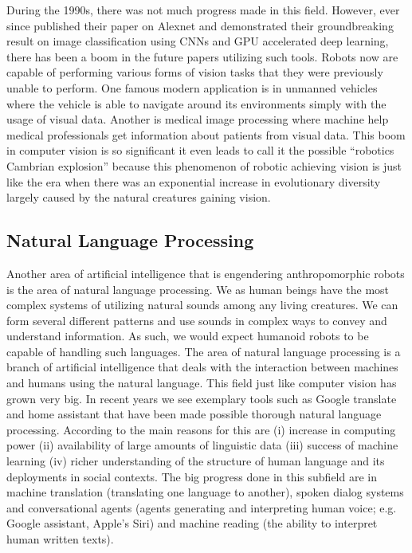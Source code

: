 \documentclass[conference]{IEEEtran}
\begin{document}
During the 1990s, there was not much progress made in this field. However, ever since \textcite{krizhevsky2012imagenet} published their paper on Alexnet and demonstrated their groundbreaking result on image classification using CNNs and GPU accelerated deep learning, there has been a boom in the future papers utilizing such tools. Robots now are capable of performing various forms of vision tasks that they were previously unable to perform. One famous modern application is in unmanned vehicles where the vehicle is able to navigate around its environments simply with the usage of visual data. Another is medical image processing where machine help medical professionals get information about patients from visual data. This boom in computer vision is so significant it even leads \textcite{pratt2015cambrian} to call it the possible ``robotics Cambrian explosion'' because this phenomenon of robotic achieving vision is just like the era when there was an exponential increase in evolutionary diversity largely caused by the natural creatures gaining vision. 


\subsection{Natural Language Processing}
Another area of artificial intelligence that is engendering anthropomorphic robots is the area of natural language processing. We as human beings have the most complex systems of utilizing natural sounds among any living creatures. We can form several different patterns and use sounds in complex ways to convey and understand information. As such, we would expect humanoid robots to be capable of handling such languages. The area of natural language processing is a branch of artificial intelligence that deals with the interaction between machines and humans using the natural language. This field just like computer vision has grown very big. In recent years we see exemplary tools such as Google translate and home assistant that have been made possible thorough natural language processing. According to \textcite{hirschberg2015advances} the main reasons for this are (i) increase in computing power (ii) availability of large amounts of linguistic data (iii) success of machine learning (iv) richer understanding of the structure of human language and its deployments in social contexts. The big progress done in this subfield are in machine translation (translating one language to another), spoken dialog systems and conversational agents (agents generating and interpreting human voice; e.g. Google assistant, Apple's Siri) and machine reading (the ability to interpret human written texts)\autocite{hirschberg2015advances}.
\end{document}
